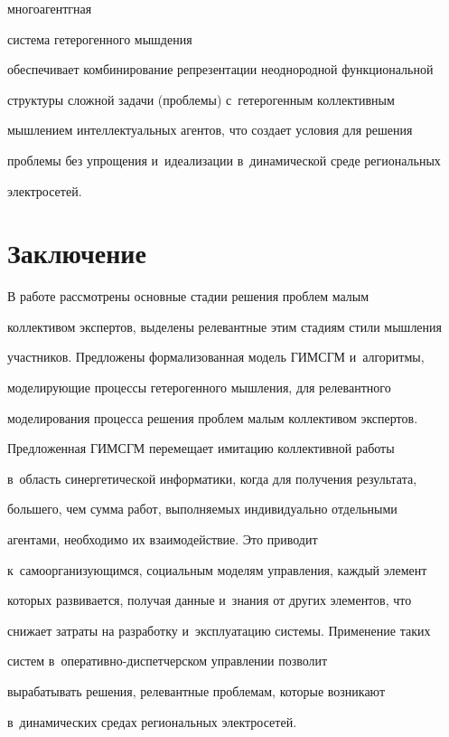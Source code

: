многоагентгная


сис\-те\-ма гетерогенного мышдения 


обеспечивает комбинирование репрезентации неоднородной функциональной 


структуры сложной задачи (проблемы) с~гетерогенным коллективным 


мышлением интеллектуальных агентов, что создает условия для решения 


проблемы без упрощения и~идеализации в~динамической среде региональных 


электросетей.


  


\section{Заключение}





  В работе рассмотрены основные стадии решения проблем малым 


коллективом экспертов, выделены релевантные этим стадиям стили мышления 


участников. Предложены формализованная модель ГИМСГМ и~алгоритмы, 


моделирующие процессы гетерогенного мышления, для релевантного 


моделирования процесса решения проблем малым коллективом экспертов. 


Предложенная ГИМСГМ перемещает имитацию коллективной работы 


в~область синергетической информатики, когда для получения результата, 


большего, чем сумма работ, выполняемых индивидуально отдельными 


агентами, необходимо их взаимодействие. Это приводит 


к~самоорганизующимся, социальным моделям управления, каждый элемент 


которых развивается, получая данные и~знания от других элементов, что 


снижает затраты на разработку и~эксплуатацию системы. Применение таких 


систем в~опе\-ра\-тив\-но-дис\-пет\-чер\-ском управлении позволит 


вырабатывать решения, релевантные проблемам, которые возникают 


в~динамических средах региональных электросетей.


